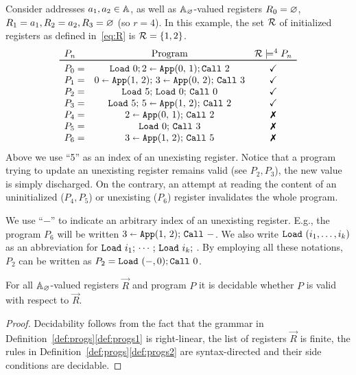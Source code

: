 \begin{exas} Consider addresses $a_1, a_2\in\Addrs $, as well as $\Addrs_\Null$-valued registers $R_0 = \Null$, $R_1 = a_1,R_2=a_2,R_3 = \Null$ (so $r = 4$).
In this example, the set $\cR$ of initialized registers as defined in~\eqref{eq:R} is $\cR = \set{1,2}$.
\[
	\begin{array}{lcc}
	P_n&\textrm{Program}&\cR\models^4 P_n\\
	\toprule
	P_0=&\Load 0;\Apply012;\Call 2&\checkmark\\
	P_1=&\Apply 120;\,\Apply 023;\,\Call 3&\checkmark\\
	P_2=&\Load 5;\, \Load 0;\,\Call 0&\checkmark\\
	P_3=&\Load 5;\, \Apply 12{5};\,\Call 2&\checkmark\\
	P_4=&\Apply 012;\,\Call 2&\xmark\\
	P_5=&\Load 0;\,\Call 3&\xmark\\
	P_6=&\Apply 123;\,\Call 5&\xmark\\
	\end{array}
\]
Above we use ``5'' as an index of an unexisting register.
Notice that a program trying to update an unexisting register remains valid (see $P_2,P_3$), the new value is simply discharged.
On the contrary, an attempt at reading the content of an uninitialized ($P_4,P_5$) or unexisting ($P_6$) register invalidates the whole program.
\end{exas}

\begin{nota}\label{nota:aboutprogs}
We use ``$-$'' to indicate an arbitrary index of an unexisting   register. E.g., the program $P_6$ will be written $\Apply 123;\,\Call -$.
We also write $\Load (i_1,\dots,i_k)$ as an abbreviation for $\Load i_1;\,\cdots;\,\Load i_k;$ . By employing all these notations, $P_2$ can be written as  $P_2= \Load (-,0);\Call 0$. %
\end{nota}

\begin{lem}\label{lem:correction}
For all $\Addrs_\Null$-valued registers $\vec R$ and program $P$ it is decidable whether $P$ is valid with respect to $\vec R$.
\end{lem}

\begin{proof}
Decidability follows from the fact that the grammar in Definition~\ref{def:progs}\ref{def:progs1} is right-linear, the list of registers $\vec R$ is finite, the rules in Definition~\ref{def:progs}\ref{def:progs2} are syntax-directed and their side conditions are decidable.
\end{proof}


